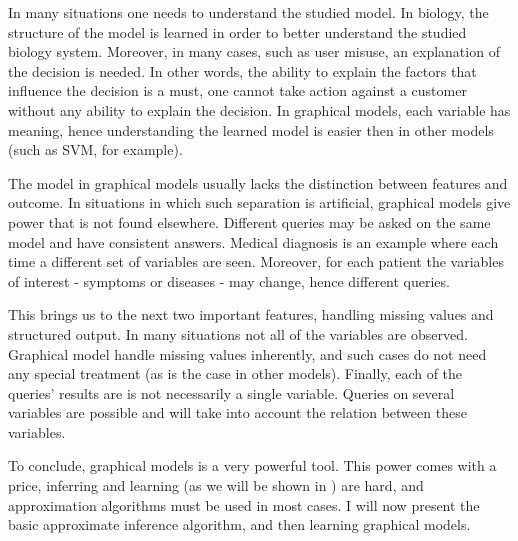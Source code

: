 In many situations one needs to understand the studied model.
In biology, the structure of the model is learned in order to better understand the studied biology system.
Moreover, in many cases, such as user misuse, an explanation of the decision is needed. 
In other words, the ability to explain the factors that influence the decision is a must, one cannot take action against a customer without any ability to explain the decision. 
In graphical models, each variable has meaning, hence understanding the learned model is easier then in other models (such as SVM, for example).

The model in graphical models usually lacks the distinction between features and outcome.
In situations in which such separation is artificial, graphical models give power that is not found elsewhere.
Different queries may be asked on the same model and have consistent answers.
Medical diagnosis is an example where each time a different set of variables are seen.
Moreover, for each patient the variables of interest - symptoms or diseases - may change, hence different queries.

This brings us to the next two important features, handling missing values and structured output.
In many situations not all of the variables are observed.
Graphical model handle missing values inherently, and such cases do not need any special treatment (as is the case in other models).
Finally, each of the queries' results are is not necessarily a single variable.
Queries on several variables are possible and will take into account the relation between these variables.

To conclude, graphical models is a very powerful tool.
This power comes with a price, inferring and learning (as we will be shown in ) are hard, and approximation algorithms must be used in most cases.
I will now present the basic approximate inference algorithm, and then learning graphical models.
